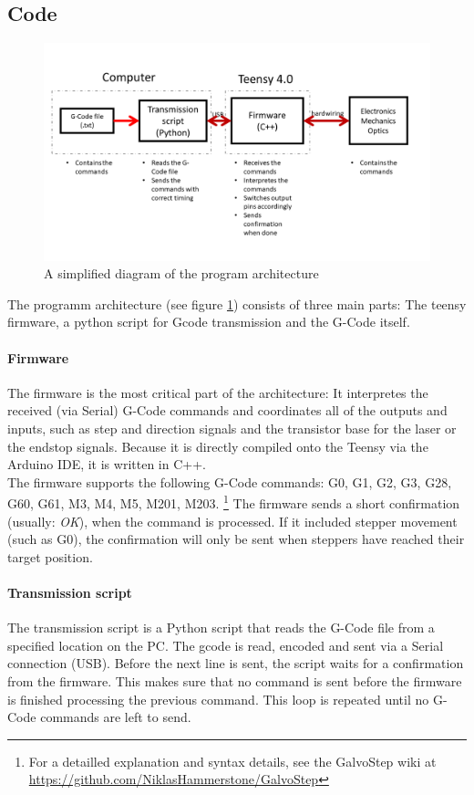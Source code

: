 \documentclass[a4paper, 11pt]{scrartcl}
\begin{document}
\subsection{Code}
\begin{figure}[H]
\begin{center}
\includegraphics[width=15cm]{img/programArchitecture.png}
\caption{A simplified diagram of the program architecture}
\label{code}
\end{center}
\end{figure}
The programm architecture (see figure \ref{code}) consists of three main parts: The teensy firmware, a python script for Gcode transmission and the G-Code itself. 
\paragraph{Firmware}
The firmware is the most critical part of the architecture: It interpretes the received (via Serial) G-Code commands and coordinates all of the outputs and inputs, such as step and direction signals and the transistor base for the laser or the endstop signals. Because it is directly compiled onto the Teensy via the Arduino IDE, it is written in C++.\\
The firmware supports the following G-Code commands: G0, G1, G2, G3, G28, G60, G61, M3, M4, M5, M201, M203. \footnote{For a detailled explanation and syntax details, see the GalvoStep wiki at \url{https://github.com/NiklasHammerstone/GalvoStep}} The firmware sends a short confirmation (usually: \textit{OK}), when the command is processed. If it included stepper movement (such as G0), the confirmation will only be sent when steppers have reached their target position.
\paragraph{Transmission script}
The transmission script is a Python script that reads the G-Code file from a specified location on the PC. The gcode is read, encoded and sent via a Serial connection (USB). Before the next line is sent, the script waits for a confirmation from the firmware. This makes sure that no command is sent before the firmware is finished processing the previous command. This loop is repeated until no G-Code commands are left to send.
\end{document}
